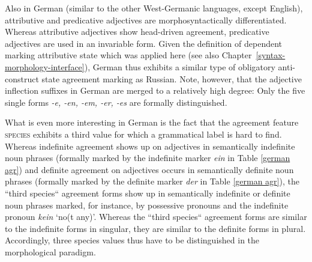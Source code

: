 Also in German (similar to the other West-Germanic languages, except English), attributive and predicative adjectives are morphosyntactically differentiated. Whereas attributive adjectives show head-driven agreement, predicative adjectives are used in an invariable form. Given the definition of dependent marking attributive state which was applied here (see also Chapter~\ref{syntax-morphology-interface}), German thus exhibits a similar type of obligatory anti-construct state agreement marking as Russian. Note, however, that the adjective inflection suffixes in German are merged to a relatively high degree: Only the five single forms \textit{-e, -en, -em, -er, -es} are formally distinguished. 

What is even more interesting in German is the fact that the agreement feature \textsc{species} exhibits a third value for which a grammatical label is hard to find. Whereas indefinite agreement shows up on adjectives in semantically indefinite noun phrases (formally marked by the indefinite marker \textit{ein} in Table \ref{german agr}) and definite agreement on adjectives occurs in semantically definite noun phrases (formally marked by the definite marker \textit{der} in Table \ref{german agr}), the “third species“ agreement forms show up in semantically indefinite or definite noun phrases marked, for instance, by possessive pronouns and the indefinite pronoun \textit{kein} ‘no(t any)’. Whereas the “third species“ agreement forms are similar to the indefinite forms in singular, they are similar to the definite forms in plural. Accordingly, three species values thus have to be distinguished in the morphological paradigm.

